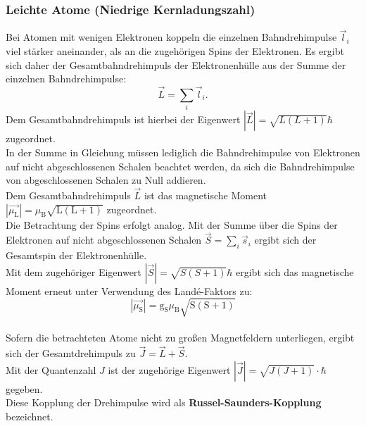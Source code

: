 \subsubsection{Leichte Atome (Niedrige Kernladungszahl)}
Bei Atomen mit wenigen Elektronen koppeln die einzelnen Bahndrehimpulse $\vec{l}_i$ viel stärker aneinander, als an die zugehörigen Spins der Elektronen. Es ergibt sich daher der Gesamtbahndrehimpuls der Elektronenhülle aus der Summe der einzelnen Bahndrehimpulse:
\begin{equation}
  \label{eqn:l}
  \vec{L}=\sum_i{\vec{l}_i}\mathrm{.}
\end{equation}
Dem Gesamtbahndrehimpuls ist hierbei der Eigenwert $|\vec{L}|=\sqrt{L\left(L+1\right)} \hbar$ zugeordnet.\\
In der Summe in Gleichung  müssen lediglich die Bahndrehimpulse von Elektronen auf nicht abgeschlossenen Schalen beachtet werden, da sich die Bahndrehimpulse von abgeschlossenen Schalen zu Null addieren.\\
Dem Gesamtbahndrehimpuls $\vec{L}$ ist das magnetische Moment $|\vec{\mu_{\mathrm{L}}}|=\mu_{\mathrm{B}}\sqrt{\mathrm{L}\left(\mathrm{L}+1\right)}$ zugeordnet.\\
Die Betrachtung der Spins erfolgt analog. Mit der Summe über die Spins der Elektronen auf nicht abgeschlossenen Schalen $\vec{S}=\sum_i{\vec{s}_i}$
ergibt sich der Gesamtspin der Elektronenhülle.\\
Mit dem zugehöriger Eigenwert $|\vec{S}|=\sqrt{S\left(S+1\right)}\hbar$
ergibt sich das magnetische Moment erneut unter Verwendung des Landé-Faktors zu:
\begin{equation}
  |\vec{\mu_{\mathrm{S}}}|=\mathrm{g_S}\mu_{\mathrm{B}}\sqrt{\mathrm{S}\left(\mathrm{S}+1\right)}
\end{equation}\\
Sofern die betrachteten Atome nicht zu großen Magnetfeldern unterliegen, ergibt sich der Gesamtdrehimpuls zu $\vec{J}=\vec{L}+\vec{S}$.\\
Mit der Quantenzahl $J$ ist der zugehörige Eigenwert $|\vec{J}|=\sqrt{J(J+1)}\cdot \hbar$ gegeben.\\
Diese Kopplung der Drehimpulse wird als \textbf{Russel-Saunders-Kopplung} bezeichnet.
